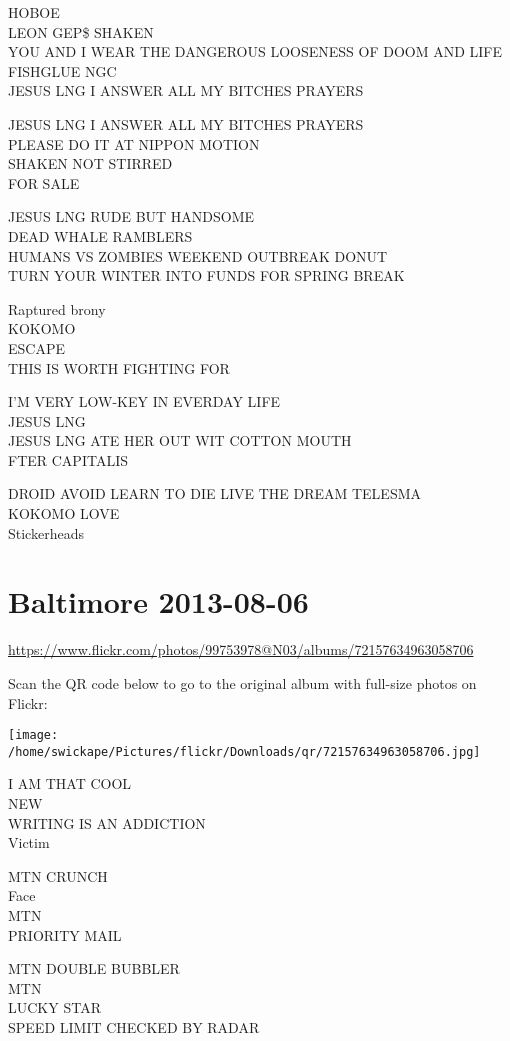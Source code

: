 \documentclass[10pt,letterpaper]{article}
\begin{document}
HOBOE\\
LEON GEP\$ SHAKEN\\
YOU AND I WEAR THE DANGEROUS LOOSENESS OF DOOM AND LIFE FISHGLUE NGC\\
JESUS LNG I ANSWER ALL MY BITCHES PRAYERS

JESUS LNG I ANSWER ALL MY BITCHES PRAYERS\\
PLEASE DO IT AT NIPPON MOTION\\
SHAKEN NOT STIRRED\\
FOR SALE

JESUS LNG RUDE BUT HANDSOME\\
DEAD WHALE RAMBLERS\\
HUMANS VS ZOMBIES WEEKEND OUTBREAK DONUT\\
TURN YOUR WINTER INTO FUNDS FOR SPRING BREAK

Raptured brony\\
KOKOMO\\
ESCAPE\\
THIS IS WORTH FIGHTING FOR

I'M VERY LOW{-}KEY IN EVERDAY LIFE\\
JESUS LNG\\
JESUS LNG ATE HER OUT WIT COTTON MOUTH\\
FTER CAPITALIS

DROID AVOID LEARN TO DIE LIVE THE DREAM TELESMA\\
KOKOMO LOVE\\
Stickerheads


\section*{Baltimore 2013-08-06}

\url{https://www.flickr.com/photos/99753978@N03/albums/72157634963058706}

Scan the QR code below to go to the original album with full-size photos on Flickr:

\texttt{[image: /home/swickape/Pictures/flickr/Downloads/qr/72157634963058706.jpg]}


I AM THAT COOL\\
NEW\\
WRITING IS AN ADDICTION\\
Victim

MTN CRUNCH\\
Face\\
MTN\\
PRIORITY MAIL

MTN DOUBLE BUBBLER\\
MTN\\
LUCKY STAR\\
SPEED LIMIT CHECKED BY RADAR
\end{document}
